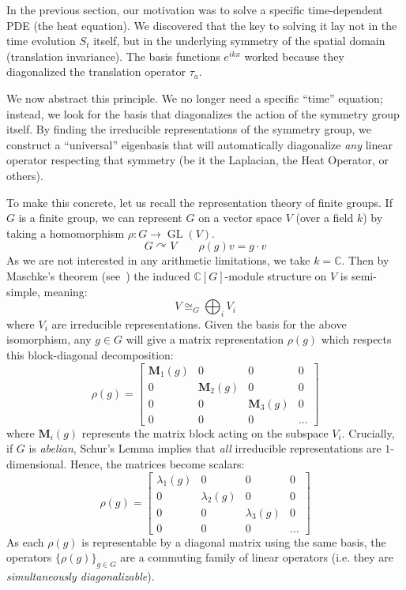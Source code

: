 \documentclass{article}
\newcommand{\C}{{\mathbb{C}}}
\newcommand{\GL}{{\operatorname{GL}}}
\newcommand{\actson}{\curvearrowright}
\begin{document}
In the previous section, our motivation was to solve a specific time-dependent PDE (the heat equation). We
discovered that the key to solving it lay not in the time evolution $S_t$ itself, but in the underlying
symmetry of the spatial domain (translation invariance). The basis functions $e^{ikx}$ worked because they
diagonalized the translation operator $\tau_a$.

We now abstract this principle. We no longer need a specific ``time'' equation; instead, we look for the
basis that diagonalizes the action of the symmetry group itself. By finding the irreducible representations
of the symmetry group, we construct a ``universal'' eigenbasis that will automatically diagonalize \emph{any}
linear operator respecting that symmetry (be it the Laplacian, the Heat Operator, or others).

To make this concrete, let us recall the representation theory of finite groups.
If $G$ is a finite group, we can represent $G$ on a vector space $V$ (over a field $k$) by
taking a homomorphism $\rho: G \to \GL(V)$.
\[
    G \actson V \qquad \rho(g)v = g \cdot v
\]
As we are not interested in any arithmetic limitations, we take $k = \C$. Then by Maschke's theorem
(see~\cite[chapter~24]{NateAlgebra}) the induced $\C[G]$-module structure on $V$ is
semi-simple, meaning:
\[
	 V \cong_G \bigoplus_i V_i
\]
where $V_i$ are irreducible representations. Given the basis for the above isomorphism, any $g \in G$
will give a matrix representation $\rho(g)$ which respects this block-diagonal decomposition:
\[
\rho(g) = \begin{bmatrix}
\mathbf{M}_1(g) & 0 & 0 & 0 \\
0 & \mathbf{M}_2(g) & 0 & 0 \\
0 & 0 & \mathbf{M}_3(g) & 0 \\
0 & 0 & 0 & \dots
\end{bmatrix}
\]
where $\mathbf{M}_i(g)$ represents the matrix block acting on the subspace $V_i$. Crucially, if $G$ is
\emph{abelian}, Schur's Lemma implies that \emph{all} irreducible representations are $1$-dimensional. Hence,
the matrices become scalars:
\[
\rho(g) = \begin{bmatrix}
\lambda_1(g) & 0 & 0 & 0 \\
0 & \lambda_2(g) & 0 & 0 \\
0 & 0 & \lambda_3(g) & 0 \\
0 & 0 & 0 & \dots
\end{bmatrix}
\]
As each $\rho(g)$ is representable by a diagonal matrix using the same basis, the operators $\{\rho(g)\}_{g
\in G}$ are a commuting family of linear operators (i.e. they are \emph{simultaneously diagonalizable}).
\end{document}
